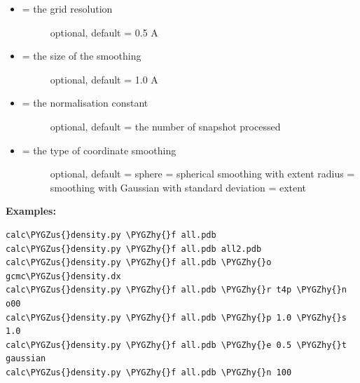\documentclass[letterpaper,10pt,english]{sphinxmanual}
\def\PYGZus{\char`\_}
\def\PYGZhy{\char`\-}
\begin{document}
\begin{itemize}
\begin{description}
\end{description}

\item {} \begin{description}
\item[{ = the grid resolution}] \leavevmode
optional, default = 0.5 A

\end{description}

\item {} \begin{description}
\item[{ = the size of the smoothing}] \leavevmode
optional, default =  1.0 A

\end{description}

\item {} \begin{description}
\item[{ = the normalisation constant}] \leavevmode
optional, default = the number of snapshot processed

\end{description}

\item {} \begin{description}
\item[{ = the type of coordinate smoothing}] \leavevmode
optional, default = sphere
 = spherical smoothing with extent radius
 = smoothing with Gaussian with standard deviation = extent

\end{description}

\end{itemize}

\textbf{Examples:}

\begin{Verbatim}[commandchars=\\\{\}]
calc\PYGZus{}density.py \PYGZhy{}f all.pdb
calc\PYGZus{}density.py \PYGZhy{}f all.pdb all2.pdb
calc\PYGZus{}density.py \PYGZhy{}f all.pdb \PYGZhy{}o gcmc\PYGZus{}density.dx
calc\PYGZus{}density.py \PYGZhy{}f all.pdb \PYGZhy{}r t4p \PYGZhy{}n o00
calc\PYGZus{}density.py \PYGZhy{}f all.pdb \PYGZhy{}p 1.0 \PYGZhy{}s 1.0
calc\PYGZus{}density.py \PYGZhy{}f all.pdb \PYGZhy{}e 0.5 \PYGZhy{}t gaussian
calc\PYGZus{}density.py \PYGZhy{}f all.pdb \PYGZhy{}n 100
\end{Verbatim}
\end{document}
